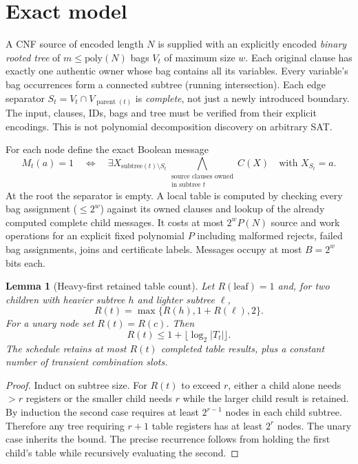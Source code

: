 \documentclass[11pt]{article}
\newtheorem{lemma}[theorem]{Lemma}
\begin{document}
\section{Exact model}
A CNF source of encoded length $N$ is supplied with an explicitly encoded \emph{binary rooted tree} of $m\le \mathrm{poly}(N)$ bags $V_t$ of maximum size $w$. Each original clause has exactly one authentic owner whose bag contains all its variables. Every variable's bag occurrences form a connected subtree (running intersection). Each edge separator $S_t=V_t\cap V_{\operatorname{parent}(t)}$ is \emph{complete}, not just a newly introduced boundary. The input, clauses, IDs, bags and tree must be verified from their explicit encodings. This is not polynomial decomposition discovery on arbitrary SAT.

For each node define the exact Boolean message
\[
 M_t(a)=1\quad\Longleftrightarrow\quad
 \exists X_{\mathrm{subtree}(t)\setminus S_t}
 \bigwedge_{\substack{\text{source clauses owned}\\\text{in subtree }t}} C(X)
 \quad\text{with }X_{S_t}=a.
\]
At the root the separator is empty. A local table is computed by checking every bag assignment ($\le2^w$) against its owned clauses and lookup of the already computed complete child messages. It costs at most $2^w P(N)$ source and work operations for an explicit fixed polynomial $P$ including malformed rejects, failed bag assignments, joins and certificate labels. Messages occupy at most $B=2^w$ bits each.

\begin{lemma}[Heavy-first retained table count]
Let $R(\text{leaf})=1$ and, for two children with heavier subtree $h$ and lighter subtree $\ell$,
\[
 R(t)=\max\{R(h),1+R(\ell),2\}.
\]
For a unary node set $R(t)=R(c)$. Then
\[
 \boxed{R(t)\le1+\lfloor\log_2|T_t|\rfloor.}
\]
The schedule retains at most $R(t)$ completed table results, plus a constant number of transient combination slots.
\end{lemma}
\begin{proof}
Induct on subtree size. For $R(t)$ to exceed $r$, either a child alone needs $>r$ registers or the smaller child needs $r$ while the larger child result is retained. By induction the second case requires at least $2^{r-1}$ nodes in each child subtree. Therefore any tree requiring $r+1$ table registers has at least $2^r$ nodes. The unary case inherits the bound. The precise recurrence follows from holding the first child's table while recursively evaluating the second.
\end{proof}
\end{document}
